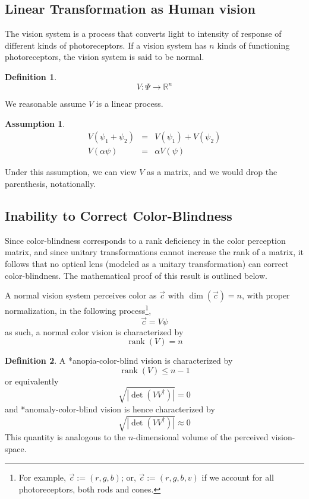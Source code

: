 \documentclass[10pt,a4paper]{article}
\newtheorem{ass}{Assumption}[section]
\theoremstyle{definition}
\newtheorem{defn}{Definition}[section]
\theoremstyle{remark}
\numberwithin{equation}{section}
\DeclareMathOperator{\rank}{rank}
\newcommand{\abs}[1]{\left\vert#1\right\vert}
\newcommand{\Real}{\mathbb R}
\newcommand{\pdet}[1]{            \sqrt{\abs{   \det    \left(#1 #1^\dagger \right)   }}               }
\begin{document}
\subsection{Linear Transformation as Human vision}
The vision system is a process that converts light to intensity of response of different kinds of photoreceptors. If a vision system has $n$ kinds of functioning photoreceptors, the vision system is said to be normal. 
\begin{defn}
\begin{equation}
V:\Psi \rightarrow \Real^n
\end{equation}
\end{defn}
We reasonable assume $V$ is a linear process.
\begin{ass}
\begin{eqnarray}
V(\psi_1+\psi_2)&=&V(\psi_1)+V(\psi_2)\\
V(\alpha \psi)&=&\alpha V(\psi)
\end{eqnarray}
\end{ass}
Under this assumption, we can view $V$ as a matrix, and we would drop the parenthesis, notationally.


\subsection{Inability to Correct Color-Blindness}
Since color-blindness corresponds to a rank deficiency in the color perception matrix, and since unitary transformations cannot increase the rank of a matrix, it follows that no optical lens (modeled as a unitary transformation) can correct color-blindness. The mathematical proof of this result is outlined below.

A normal vision system perceives color as $\vec{c}$ with $\dim(\vec{c})=n$, with proper normalization, in the following process\footnote{For example, $\vec{c}:= (r,g,b)$; or, $\vec{c}:= (r,g,b,v)$ if we account for all photoreceptors, both rods and cones.}, 
\begin{equation}
\vec{c} = V \psi 
\end{equation}
as such, a normal color vision is characterized by 
\begin{equation}
\rank(V)=n
\end{equation}


\begin{defn}
A *anopia-color-blind vision is characterized by 
\begin{equation}
\rank(V)\leq n-1
\end{equation}
or equivalently
\begin{equation}
\pdet{V}= 0
\end{equation}
and *anomaly-color-blind vision is hence characterized by 
\begin{equation}
\pdet{V}\approx 0
\end{equation}
This quantity is analogous to the  $n$-dimensional volume of the perceived vision-space.
\end{defn}
\end{document}
